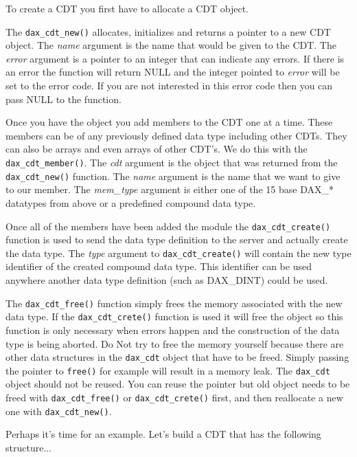 To create a CDT you first have to allocate a CDT object.

The \verb|dax_cdt_new()| allocates, initializes and returns a pointer to a new CDT object.  The \textit{name} argument is the name that would be given to the CDT.  The \textit{error} argument is a pointer to an integer that can indicate any errors.  If there is an error the function will return NULL and the integer pointed to \textit{error} will be set to the error code.  If you are not interested in this error code then you can pass NULL to the function.

Once you have the object you add members to the CDT one at a time.  These members can be of any previously defined data type including other CDTs.  They can also be arrays and even arrays of other CDT's.  We do this with the \verb|dax_cdt_member()|.  The \textit{cdt} argument is the object that was returned from the \verb|dax_cdt_new()| function.  The \textit{name} argument is the name that we want to give to our member.  The \textit{mem\_type} argument is either one of the 15 base DAX\_* datatypes from above or a predefined compound data type.

Once all of the members have been added the module the \verb|dax_cdt_create()| function is used to send the data type definition to the server and actually create the data type.  The \textit{type} argument to \verb|dax_cdt_create()| will contain the new type identifier of the created compound data type.  This identifier can be used anywhere another data type definition (such as DAX\_DINT) could be used.

The \verb|dax_cdt_free()| function simply
frees the memory associated with the new data type.  If the
\verb|dax_cdt_crete()| function is used it will free the object so this
function is only necessary when errors happen and the construction of the
data type is being aborted.  Do Not try to free the memory yourself because
there are other data structures in the \verb|dax_cdt| object that have to be
freed.  Simply passing the pointer to \verb|free()| for example will result
in a memory leak.  The \verb|dax_cdt| object should
not be reused.  You can reuse the pointer but old object needs to be
freed with \verb|dax_cdt_free()| or \verb|dax_cdt_crete()| first, and then
reallocate a new one with  \verb|dax_cdt_new()|.

Perhaps it's time for an example.  Let's build a CDT that has the following structure...

